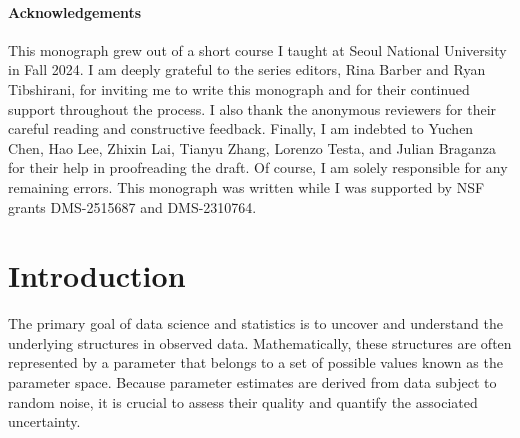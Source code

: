 \documentclass[11pt]{article}
\theoremstyle{plain}
\begin{document}
\begin{abstract}
In this article, we investigate one of the most widely used resampling techniques for model comparison and evaluation---cross-validation (CV)---through the lens of stability. We begin by reviewing recent theoretical developments in CV for generalization error estimation and model selection under stability assumptions. We then explore more refined results concerning uncertainty quantification for CV-based risk estimates. By integrating these research directions, we uncover new theoretical insights and methodological tools. Finally, we illustrate their utility across both classical and contemporary topics, including model selection, selective inference, and conformal prediction.
\end{abstract}

\paragraph{Acknowledgements} This monograph grew out of a short course I taught at Seoul National University in Fall 2024. I am deeply grateful to the series editors, Rina Barber and Ryan Tibshirani, for inviting me to write this monograph and for their continued support throughout the process. I also thank the anonymous reviewers for their careful reading and constructive feedback. Finally, I am indebted to Yuchen Chen, Hao Lee, Zhixin Lai, Tianyu Zhang, Lorenzo Testa, and Julian Braganza for their help in proofreading the draft. Of course, I am solely responsible for any remaining errors. This monograph was written while I was supported by NSF grants DMS-2515687 and DMS-2310764.

\tableofcontents

\newpage

\section{Introduction}

The primary goal of data science and statistics is to uncover and understand the underlying
structures in observed data. Mathematically, these structures are often represented by a
parameter that belongs to a set of possible values known as the parameter space. 
Because parameter estimates are derived from data subject to random noise, it is crucial
to assess their quality and quantify the associated uncertainty.
\end{document}
